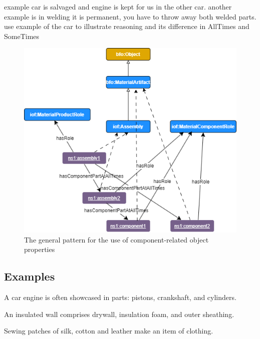 example car is salvaged and engine is kept for us in the other car. 
another example is in welding it is permanent, you have to throw away both welded parts. 
use example of the car to illustrate reasoning and its difference in AllTimes and SomeTimes

\begin{figure}
\includegraphics[scale=0.5]{scenarios/assemblies-components/images/assembly-components-generic.png}
\caption{The general pattern for the use of component-related object properties} 
\label{gen-pttn-components}
\end{figure}


\subsection*{Examples}

A car engine is often showcased in parts: pistons, crankshaft, and cylinders.

An insulated wall comprises drywall, insulation foam, and outer sheathing.

Sewing patches of silk, cotton and leather make an item of clothing.

